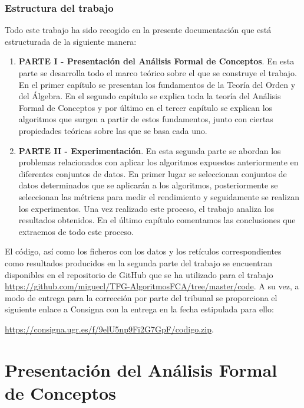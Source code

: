 \documentclass[oneside,openright,titlepage,numbers=noenddot,openany,headinclude,footinclude=true,
cleardoublepage=empty,abstractoff,BCOR=5mm,paper=a4,fontsize=12pt,main=spanish]{scrreprt}
\begin{document}
\section{Estructura del trabajo}

Todo este trabajo ha sido recogido en la presente documentación que está estructurada de la siguiente manera:

\begin{enumerate}
    \item \textbf{PARTE I - Presentación del Análisis Formal de Conceptos}. En esta parte se desarrolla todo el marco teórico sobre el que se construye el trabajo. En el primer capítulo se presentan los fundamentos de la Teoría del Orden y del Álgebra. En el segundo capítulo se explica toda la teoría del Análisis Formal de Conceptos y por último en el tercer capítulo se explican los algoritmos que surgen a partir de estos fundamentos, junto con ciertas propiedades teóricas sobre las que se basa cada uno. 
    \item \textbf{PARTE II - Experimentación}. En esta segunda parte se abordan los problemas relacionados con aplicar los algoritmos expuestos anteriormente en diferentes conjuntos de datos. En primer lugar se seleccionan conjuntos de datos determinados que se aplicarán a los algoritmos, posteriormente se seleccionan las métricas para medir el rendimiento y seguidamente se realizan los experimentos. Una vez realizado este proceso, el trabajo analiza los resultados obtenidos. En el último capítulo comentamos las conclusiones que extraemos de todo este proceso. 
\end{enumerate}

El código, así como los ficheros con los datos y los retículos correspondientes como resultados producidos en la segunda parte del trabajo se encuentran disponibles en el repositorio de GitHub que se ha utilizado para el trabajo \href{https://github.com/miguecl97/TFG-AlgoritmosFCA/tree/master/code}{https://github.com/miguecl/TFG-AlgoritmosFCA/tree/master/code}. A su vez, a modo de entrega para la corrección por parte del tribunal se proporciona el siguiente enlace a Consigna con la entrega en la fecha estipulada para ello:

\href{https://consigna.ugr.es/f/9elU5np9Fi2G7GpF/codigo.zip}{https://consigna.ugr.es/f/9elU5np9Fi2G7GpF/codigo.zip}.




\part{Presentación del Análisis Formal de Conceptos}
\end{document}
